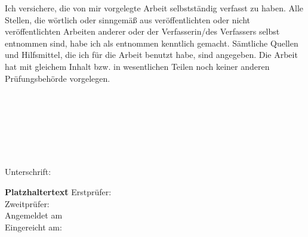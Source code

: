 Ich versichere, die von mir vorgelegte Arbeit selbstständig verfasst zu haben. Alle Stellen, die wörtlich oder sinngemäß aus veröffentlichten oder nicht veröffentlichten Arbeiten anderer oder der Verfasserin/des Verfassers selbst entnommen sind, habe ich als entnommen kenntlich gemacht. Sämtliche Quellen und Hilfsmittel, die ich für die Arbeit benutzt habe, sind angegeben. Die Arbeit hat mit gleichem Inhalt bzw. in wesentlichen Teilen noch keiner anderen Prüfungsbehörde vorgelegen.
\\\\
\\\\
\workAutor
\\\\
\\\\
\workStadtDatum \hfill{} Unterschrift: \hrulefill

\vfill
\begin{tabbing}
\textbf{Platzhaltertext}\qquad \= \kill
    \textsf{Erstprüfer:} \> 	\textsf{\workReferent}\\[0.2cm]
    \textsf{Zweitprüfer:} \> \textsf{\workKorreferent}\\[0.2cm]
    \textsf{Angemeldet am} \> \textsf{\workAusgabe}\\[0.2cm]
\textsf{Eingereicht am:} \> \textsf{\workAbgabe}\\[0.2cm]
\end{tabbing}